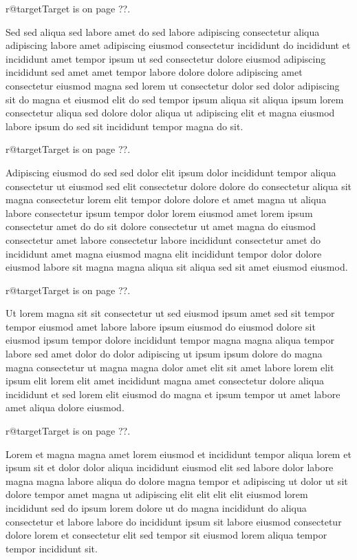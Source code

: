 \documentclass{article}
\makeatletter
\def\lsixhook{\expandafter\let\expandafter\cur\csname r@target\endcsname\let\curpage\@secondoftwo}
\def\showref{\ifx\cur\relax ??\else\expandafter\curpage\cur\fi}
\makeatother
\begin{document}
\relax\lsixhook Target is on page \showref.

Sed sed aliqua sed labore amet do sed labore adipiscing consectetur aliqua adipiscing labore amet adipiscing eiusmod consectetur incididunt do incididunt et incididunt amet tempor ipsum ut sed consectetur dolore eiusmod adipiscing incididunt sed amet amet tempor labore dolore dolore adipiscing amet consectetur eiusmod magna sed lorem ut consectetur dolor sed dolor adipiscing sit do magna et eiusmod elit do sed tempor ipsum aliqua sit aliqua ipsum lorem consectetur aliqua sed dolore dolor aliqua ut adipiscing elit et magna eiusmod labore ipsum do sed sit incididunt tempor magna do sit.

\relax\lsixhook Target is on page \showref.

Adipiscing eiusmod do sed sed dolor elit ipsum dolor incididunt tempor aliqua consectetur ut eiusmod sed elit consectetur dolore dolore do consectetur aliqua sit magna consectetur lorem elit tempor dolore dolore et amet magna ut aliqua labore consectetur ipsum tempor dolor lorem eiusmod amet lorem ipsum consectetur amet do do sit dolore consectetur ut amet magna do eiusmod consectetur amet labore consectetur labore incididunt consectetur amet do incididunt amet magna eiusmod magna elit incididunt tempor dolor dolore eiusmod labore sit magna magna aliqua sit aliqua sed sit amet eiusmod eiusmod.

\relax\lsixhook Target is on page \showref.

Ut lorem magna sit sit consectetur ut sed eiusmod ipsum amet sed sit tempor tempor eiusmod amet labore labore ipsum eiusmod do eiusmod dolore sit eiusmod ipsum tempor dolore incididunt tempor magna magna aliqua tempor labore sed amet dolor do dolor adipiscing ut ipsum ipsum dolore do magna magna consectetur ut magna magna dolor amet elit sit amet labore lorem elit ipsum elit lorem elit amet incididunt magna amet consectetur dolore aliqua incididunt et sed lorem elit eiusmod do magna et ipsum tempor ut amet labore amet aliqua dolore eiusmod.

\relax\lsixhook Target is on page \showref.

Lorem et magna magna amet lorem eiusmod et incididunt tempor aliqua lorem et ipsum sit et dolor dolor aliqua incididunt eiusmod elit sed labore dolor labore magna magna labore aliqua do dolore magna tempor et adipiscing ut dolor ut sit dolore tempor amet magna ut adipiscing elit elit elit elit eiusmod lorem incididunt sed do ipsum lorem dolore ut do magna incididunt do aliqua consectetur et labore labore do incididunt ipsum sit labore eiusmod consectetur dolore lorem et consectetur elit sed tempor sit eiusmod lorem aliqua tempor tempor incididunt sit.
\end{document}
